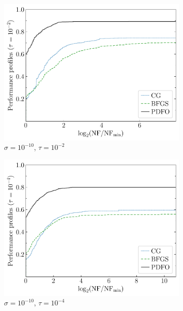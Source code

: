 \documentclass[
    smallextended,  %
    draft,          %
    final,          %
]{svjour3}
\begin{document}
\begin{figure}[htbp]
\begin{subfigure}{.48\textwidth}
        \centering
        \includegraphics[width=\textwidth]{perf-noisy-bfgs_cg_pdfo-50-10-2.pdf}
        \caption{$\sigma = 10^{-10}$, $\tau = 10^{-2}$}
    \end{subfigure}
    \hfill
    \begin{subfigure}{.48\textwidth}
        \centering
        \includegraphics[width=\textwidth]{perf-noisy-bfgs_cg_pdfo-50-10-4.pdf}
        \caption{$\sigma = 10^{-10}$, $\tau = 10^{-4}$}
    \end{subfigure}
    \hfill
    \begin{subfigure}{.48\textwidth}
        \centering

\end{subfigure}
\end{figure}
\end{document}
